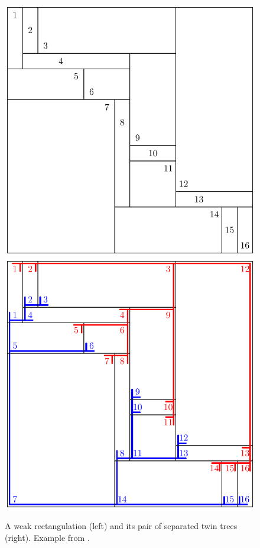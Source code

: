 \documentclass{amsart}
\theoremstyle{definition}
\begin{document}

\begin{figure}
	\centerline{\includegraphics[width=.5\textwidth]{weakRectangulation} \qquad \includegraphics[width=.5\textwidth]{weakRectangulationTrees}}
	\caption{A weak rectangulation (left) and its pair of separated twin trees (right). Example from \cite{ACFF24}.}
	\label{fig:weakRectangulation}
\end{figure}
\end{document}
